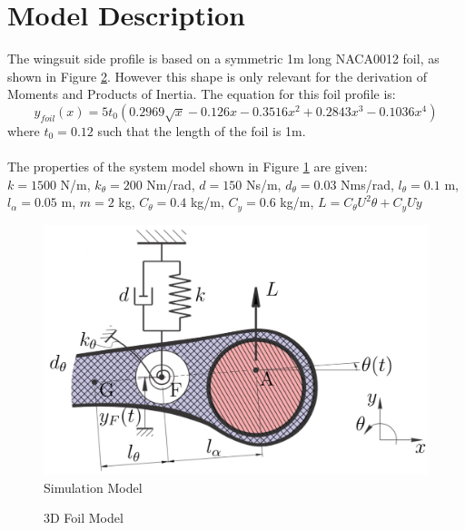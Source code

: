 \documentclass[11pt]{article}
\begin{document}
\section*{Model Description}
The wingsuit side profile is based on a symmetric 1m long NACA0012 foil, as shown in Figure \ref{fig:3d_model}.
However this shape is only relevant for the derivation of Moments and Products of Inertia. The equation for this foil profile is:
\begin{equation}
  y_{foil}(x) = 5t_0(0.2969\sqrt{x}-0.126x-0.3516x^2+0.2843x^3-0.1036x^4) \label{eq:foil}
\end{equation}
where $t_0 = 0.12$ such that the length of the foil is 1m.
\\\\
The properties of the system model shown in Figure \ref{fig:sim_model} are given: \\
$k = 1500$ N/m, $k_{\theta} = 200$ Nm/rad, $d = 150$ Ns/m, $d_{\theta} = 0.03$ Nms/rad, $l_{\theta} = 0.1$ m, $l_{\alpha} = 0.05$ m, $m = 2$ kg, $C_{\theta} = 0.4$ kg/m, $C_y = 0.6$ kg/m, $L = C_{\theta}U^2\theta+C_yU\dot{y}$
\begin{figure}
  \centering
  \includegraphics[width=170mm, trim=3 3 3 3, clip]{model.png}
  \caption{Simulation Model}\label{fig:sim_model}
\end{figure}

\begin{figure}
  \centering
  \caption{3D Foil Model}\label{fig:3d_model}
\end{figure}
\end{document}
